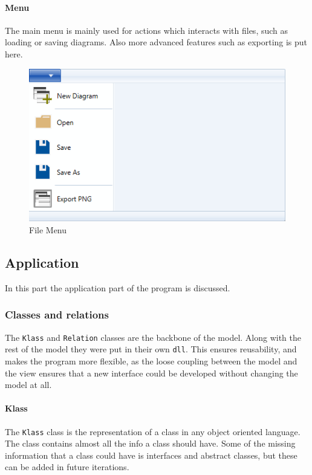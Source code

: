 \paragraph{Menu}
The main menu is mainly used for actions which interacts with files, such as
loading or saving diagrams. Also more advanced features such as exporting is put
here.

\begin{figure}[H]
\centering
\includegraphics[width=\linewidth]{"img/file menu"}
\caption{File Menu \label{menu}}
\end{figure}

\subsection{Application}
In this part the application part of the program is discussed.

\subsubsection{Classes and relations}
The \texttt{Klass} and \texttt{Relation} classes are the backbone of the model.
Along with the rest of the model they were put in their own \texttt{dll}. This ensures reusability, and makes
the program more flexible, as the loose coupling between the model and the view
ensures that a new interface could be developed without changing the model at
all.

\paragraph{Klass}
The \texttt{Klass} class is the representation of a class in any object oriented
language. The class contains almost all the info a class should have. Some of
the missing information that a class could have is interfaces and abstract classes,
but these can be added in future iterations.

